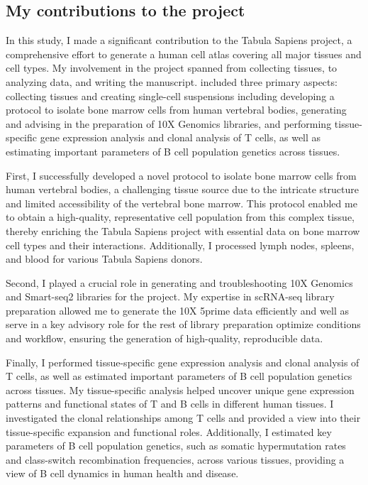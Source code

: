 \subsection{My contributions to the project}
In this study, I made a significant contribution to the Tabula Sapiens project, a comprehensive effort to generate a human cell atlas covering all major tissues and cell types. My involvement in the project spanned from collecting tissues, to analyzing data,  and writing the manuscript. included three primary aspects: collecting tissues and creating single-cell suspensions including developing a protocol to isolate bone marrow cells from human vertebral bodies, generating and advising in the preparation of 10X Genomics libraries, and performing tissue-specific gene expression analysis and clonal analysis of T cells, as well as estimating important parameters of B cell population genetics across tissues.

First, I successfully developed a novel protocol to isolate bone marrow cells from human vertebral bodies, a challenging tissue source due to the intricate structure and limited accessibility of the vertebral bone marrow. This protocol enabled me to obtain a high-quality, representative cell population from this complex tissue, thereby enriching the Tabula Sapiens project with essential data on bone marrow cell types and their interactions. Additionally, I processed lymph nodes, spleens, and blood for various Tabula Sapiens donors.

Second, I played a crucial role in generating and troubleshooting 10X Genomics and Smart-seq2 libraries for the project. My expertise in scRNA-seq library preparation allowed me to generate the 10X 5prime data efficiently and well as serve in a key advisory role for the rest of library preparation optimize conditions and workflow, ensuring the generation of high-quality, reproducible data.

Finally, I performed tissue-specific gene expression analysis and clonal analysis of T cells, as well as estimated important parameters of B cell population genetics across tissues. My tissue-specific analysis helped uncover unique gene expression patterns and functional states of T and B cells in different human tissues. I investigated the clonal relationships among T cells and provided a view into their tissue-specific expansion and functional roles. Additionally, I estimated key parameters of B cell population genetics, such as somatic hypermutation rates and class-switch recombination frequencies, across various tissues, providing a view of B cell dynamics in human health and disease. 


